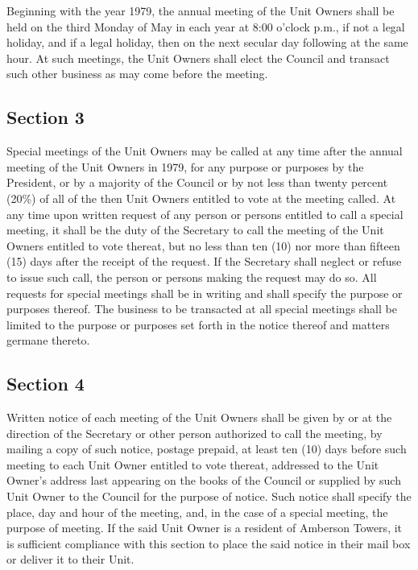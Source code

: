 \documentclass[
]{book}
\begin{document}
Beginning with the year 1979, the annual meeting of the Unit Owners shall be held on the third Monday of May in each year at 8:00 o'clock p.m., if not a legal holiday, and if a legal holiday, then on the next secular day following at the same hour. At such meetings, the Unit Owners shall elect the Council and transact such other business as may come before the meeting.

\hypertarget{section-3}{%
\subsection*{Section 3}\label{section-3}}

Special meetings of the Unit Owners may be called at any time after the annual meeting of the Unit Owners in 1979, for any purpose or purposes by the President, or by a majority of the Council or by not less than twenty percent (20\%) of all of the then Unit Owners entitled to vote at the meeting called. At any time upon written request of any person or persons entitled to call a special meeting, it shall be the duty of the Secretary to call the meeting of the Unit Owners entitled to vote thereat, but no less than ten (10) nor more than fifteen (15) days after the receipt of the request. If the Secretary shall neglect or refuse to issue such call, the person or persons making the request may do so. All requests for special meetings shall be in writing and shall specify the purpose or purposes thereof. The business to be transacted at all special meetings shall be limited to the purpose or purposes set forth in the notice thereof and matters germane thereto.

\hypertarget{section-4}{%
\subsection*{Section 4}\label{section-4}}

Written notice of each meeting of the Unit Owners shall be given by or at the direction of the Secretary or other person authorized to call the meeting, by mailing a copy of such notice, postage prepaid, at least ten (10) days before such meeting to each Unit Owner entitled to vote thereat, addressed to the Unit Owner's address last appearing on the books of the Council or supplied by such Unit Owner to the Council for the purpose of notice. Such notice shall specify the place, day and hour of the meeting, and, in the case of a special meeting, the purpose of meeting. If the said Unit Owner is a resident of Amberson Towers, it is sufficient compliance with this section to place the said notice in their mail box or deliver it to their Unit.
\end{document}
